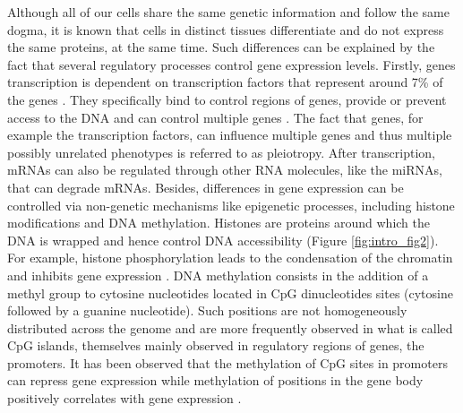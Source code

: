 Although all of our cells share the same genetic information and follow the same dogma, it is known that cells in distinct tissues differentiate and do not express the same proteins, at the same time. Such differences can be explained by the fact that several regulatory processes control gene expression levels.
Firstly, genes transcription is dependent on transcription factors that represent around 7\% of the genes \cite{Weinberg2014}. They specifically bind to control regions of genes,  provide or prevent access to the \gls*{DNA} and can control multiple genes \cite{Weinberg2014}. The fact that genes, for example the transcription factors, can influence multiple genes and thus multiple possibly unrelated phenotypes is referred to as pleiotropy.
After transcription, \gls{mRNAs} can also be regulated through other \gls*{RNA} molecules, like the \gls{miRNAs}, that can degrade \gls{mRNAs}. %
Besides, differences in gene expression can be controlled via non-genetic mechanisms like epigenetic processes, including histone modifications and \gls*{DNA} methylation. Histones are proteins around which the \gls*{DNA} is wrapped and hence control \gls*{DNA} accessibility (Figure \ref{fig:intro_fig2}). For example, histone phosphorylation leads to the condensation of the chromatin and inhibits gene expression \cite{Weinberg2014}.
\gls*{DNA} methylation consists in the addition of a methyl group to cytosine nucleotides located in \gls{CpG} dinucleotides sites (cytosine followed by a guanine nucleotide). Such positions are not homogeneously distributed across the genome and are more frequently observed in what is called \gls{CpG} islands, themselves mainly observed in regulatory regions of genes, the promoters. It has been observed that the methylation of \gls{CpG} sites in promoters can repress gene expression while methylation of positions in the gene body positively correlates with gene expression \cite{Ma2013a}. 
